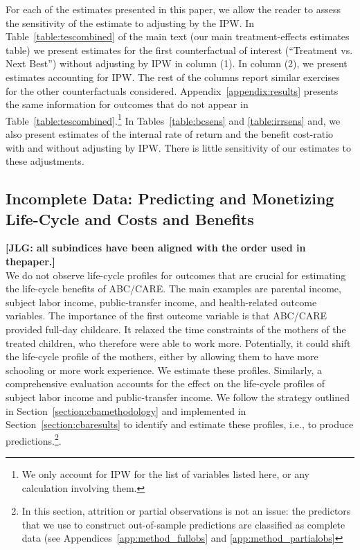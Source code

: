 \noindent For each of the estimates presented in this paper, we allow the reader to assess the sensitivity of the estimate to adjusting by the IPW. In Table~\ref{table:tescombined} of the main text (our main treatment-effects estimates table) we present estimates for the first counterfactual of interest (``Treatment vs. Next Best'') without adjusting by IPW in column (1). In column (2), we present estimates accounting for IPW. The rest of the columns report similar exercises for the other counterfactuals considered. Appendix~\ref{appendix:results} presents the same information for outcomes that do not appear in Table~\ref{table:tescombined}.\footnote{We only account for IPW for the list of variables listed here, or any calculation involving them.} In Tables~\ref{table:bcsens} and \ref{table:irrsens} and, we also present estimates of the internal rate of return and the benefit cost-ratio with and without adjusting by IPW. There is little sensitivity of our estimates to these adjustments.

\subsection{Incomplete Data: Predicting and Monetizing Life-Cycle and Costs and Benefits} \label{appendix:incomplete}
\label{app:method_noobs}

\noindent \textbf{[JLG: all subindices have been aligned with the order used in thepaper.]}\\

\noindent We do not observe life-cycle profiles for outcomes that are crucial for estimating the life-cycle benefits of ABC/CARE. The main examples are parental income, subject labor income, public-transfer income, and health-related outcome variables. The importance of the first outcome variable is that ABC/CARE provided full-day childcare. It relaxed the time constraints of the mothers of the treated children, who therefore were able to work more. Potentially, it could shift the life-cycle profile of the mothers, either by allowing them to have more schooling or more work experience. We estimate these profiles. Similarly, a comprehensive evaluation accounts for the effect on the life-cycle profiles of subject labor income and public-transfer income. We follow the strategy outlined in Section~\ref{section:cbamethodology} and implemented in Section~\ref{section:cbaresults} to identify and estimate these profiles, i.e., to produce predictions.\footnote{In this section, attrition or partial observations is not an issue: the predictors that we use to construct out-of-sample predictions are classified as complete data (see Appendices~\ref{app:method_fullobs} and \ref{app:method_partialobs}}.\\


